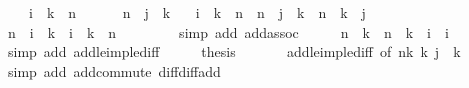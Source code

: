 \begin{isabellebody}
\ \ \ {}{\isacharcolon}{\kern0pt}\ {\isachardoublequoteopen}i\ {\isacharplus}{\kern0pt}\ k\ {\isasymle}\ n{\isachardoublequoteclose}\isanewline
\ \ \ \ \ {}{\isacharcolon}{\kern0pt}\ {\isachardoublequoteopen}n\ {\isasymle}\ j\ {\isacharplus}{\kern0pt}\ k{\isachardoublequoteclose}\isanewline
\ \ \ {\isachardoublequoteopen}i\ {\isacharplus}{\kern0pt}\ k\ {\isasymle}\ n\ {\isasymLongrightarrow}\ n\ {\isasymle}\ j\ {\isacharplus}{\kern0pt}\ k\ {\isasymLongrightarrow}\ n\ {\isacharminus}{\kern0pt}\ k\ {\isasymle}\ j{\isachardoublequoteclose}\isanewline
%
\isadelimproof
%
\endisadelimproof
%
\isatagproof
{}\isamarkupfalse%
\ {\isacharminus}{\kern0pt}\isanewline
\ \ \isamarkupfalse%
\ {\isachardoublequoteopen}n\ {\isacharminus}{\kern0pt}\ {\isacharparenleft}{\kern0pt}i\ {\isacharplus}{\kern0pt}\ k{\isacharparenright}{\kern0pt}\ {\isacharplus}{\kern0pt}\ i\ {\isacharplus}{\kern0pt}\ k\ {\isacharequal}{\kern0pt}\ n{\isachardoublequoteclose}\isanewline
\ \ \ \ \isamarkupfalse%
\ {}\ \isamarkupfalse%
\ {\isacharparenleft}{\kern0pt}simp\ add{\isacharcolon}{\kern0pt}\ add{\isachardot}{\kern0pt}assoc{\isacharparenright}{\kern0pt}\isanewline
\ \ \isamarkupfalse%
\ \isamarkupfalse%
\ {\isachardoublequoteopen}n\ {\isacharminus}{\kern0pt}\ k\ {\isacharequal}{\kern0pt}\ n\ {\isacharminus}{\kern0pt}\ k\ {\isacharminus}{\kern0pt}\ i\ {\isacharplus}{\kern0pt}\ i{\isachardoublequoteclose}\isanewline
\ \ \ \ \isamarkupfalse%
\ {}\ \isamarkupfalse%
\ {\isacharparenleft}{\kern0pt}simp\ add{\isacharcolon}{\kern0pt}\ add{\isacharunderscore}{\kern0pt}le{\isacharunderscore}{\kern0pt}imp{\isacharunderscore}{\kern0pt}le{\isacharunderscore}{\kern0pt}diff{\isacharparenright}{\kern0pt}\isanewline
\ \ \isamarkupfalse%
\ \isamarkupfalse%
\ {\isacharquery}{\kern0pt}thesis\isanewline
\ \ \ \ \isamarkupfalse%
\ {}\ add{\isacharunderscore}{\kern0pt}le{\isacharunderscore}{\kern0pt}imp{\isacharunderscore}{\kern0pt}le{\isacharunderscore}{\kern0pt}diff\ {\isacharbrackleft}{\kern0pt}of\ {\isachardoublequoteopen}n{\isacharminus}{\kern0pt}k{\isachardoublequoteclose}\ k\ {\isachardoublequoteopen}j\ {\isacharplus}{\kern0pt}\ k{\isachardoublequoteclose}{\isacharbrackright}{\kern0pt}\isanewline
\ \ \ \ \isamarkupfalse%
\ {\isacharparenleft}{\kern0pt}simp\ add{\isacharcolon}{\kern0pt}\ add{\isachardot}{\kern0pt}commute\ diff{\isacharunderscore}{\kern0pt}diff{\isacharunderscore}{\kern0pt}add{\isacharparenright}{\kern0pt}\isanewline

\end{isabellebody}
